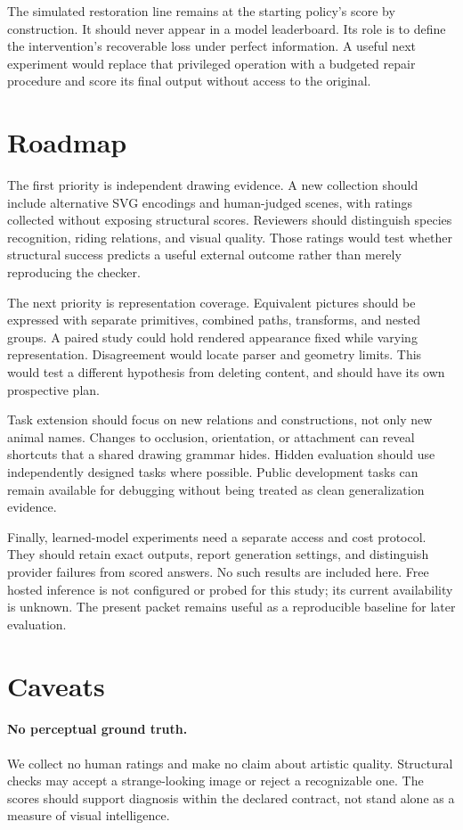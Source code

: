 \documentclass{article}
\begin{document}
The simulated restoration line remains at the starting policy's score by construction. It should never appear in a model leaderboard. Its role is to define the intervention's recoverable loss under perfect information. A useful next experiment would replace that privileged operation with a budgeted repair procedure and score its final output without access to the original.

\section{Roadmap}
The first priority is independent drawing evidence. A new collection should include alternative SVG encodings and human-judged scenes, with ratings collected without exposing structural scores. Reviewers should distinguish species recognition, riding relations, and visual quality. Those ratings would test whether structural success predicts a useful external outcome rather than merely reproducing the checker.

The next priority is representation coverage. Equivalent pictures should be expressed with separate primitives, combined paths, transforms, and nested groups. A paired study could hold rendered appearance fixed while varying representation. Disagreement would locate parser and geometry limits. This would test a different hypothesis from deleting content, and should have its own prospective plan.

Task extension should focus on new relations and constructions, not only new animal names. Changes to occlusion, orientation, or attachment can reveal shortcuts that a shared drawing grammar hides. Hidden evaluation should use independently designed tasks where possible. Public development tasks can remain available for debugging without being treated as clean generalization evidence.

Finally, learned-model experiments need a separate access and cost protocol. They should retain exact outputs, report generation settings, and distinguish provider failures from scored answers. No such results are included here. Free hosted inference is not configured or probed for this study; its current availability is unknown. The present packet remains useful as a reproducible baseline for later evaluation.

\section{Caveats}
\paragraph{No perceptual ground truth.} We collect no human ratings and make no claim about artistic quality. Structural checks may accept a strange-looking image or reject a recognizable one. The scores should support diagnosis within the declared contract, not stand alone as a measure of visual intelligence.
\end{document}

